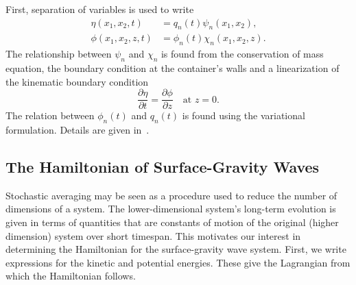 First, separation of variables is used to write
\begin{align*}
\eta (x_1,x_2, t)& = q_n (t) \psi_n (x_1,x_2),\\
\phi (x_1,x_2,z,t)& = \phi_n (t) \chi_n (x_1,x_2,z).
\end{align*}
The relationship between $\psi_n$ and $\chi_n$ is found from the conservation of mass equation, the boundary condition at the container's walls and a linearization of the kinematic boundary condition
\begin{equation}
\frac{\partial \eta}{\partial t} = \frac{\partial \phi}{\partial z} \quad \text{at } z = 0.
\end{equation}
The relation between $\phi_n(t)$ and $q_n(t)$ is found using the variational formulation. Details are given in~\citet[\S2]{miles76:_nonlin}.



\subsection{The Hamiltonian of Surface-Gravity Waves}
\label{s:Hamiltonian}

Stochastic averaging may be seen as a procedure used to reduce the number of dimensions of a system. The lower-dimensional system's long-term evolution is given in terms of quantities that are constants of motion of the original (higher dimension) system over short timespan. This motivates our interest in determining the Hamiltonian for the surface-gravity wave system. First, we write expressions for the kinetic and potential energies. These give the Lagrangian from which the Hamiltonian follows.

